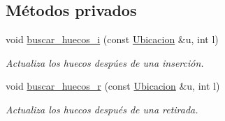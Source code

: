 \subsection*{Métodos privados}
\begin{DoxyCompactItemize}
\item 
void \hyperlink{class_terminal_a204fc08e3b6f13f75c525f282b023b19}{buscar\+\_\+huecos\+\_\+i} (const \hyperlink{class_ubicacion}{Ubicacion} \&u, int l)
\begin{DoxyCompactList}\small\item\em Actualiza los huecos despúes de una inserción. \end{DoxyCompactList}\item 
void \hyperlink{class_terminal_a56204987306ed811046d3ade11fff2cb}{buscar\+\_\+huecos\+\_\+r} (const \hyperlink{class_ubicacion}{Ubicacion} \&u, int l)
\begin{DoxyCompactList}\small\item\em Actualiza los huecos después de una retirada. \end{DoxyCompactList}\end{DoxyCompactItemize}
